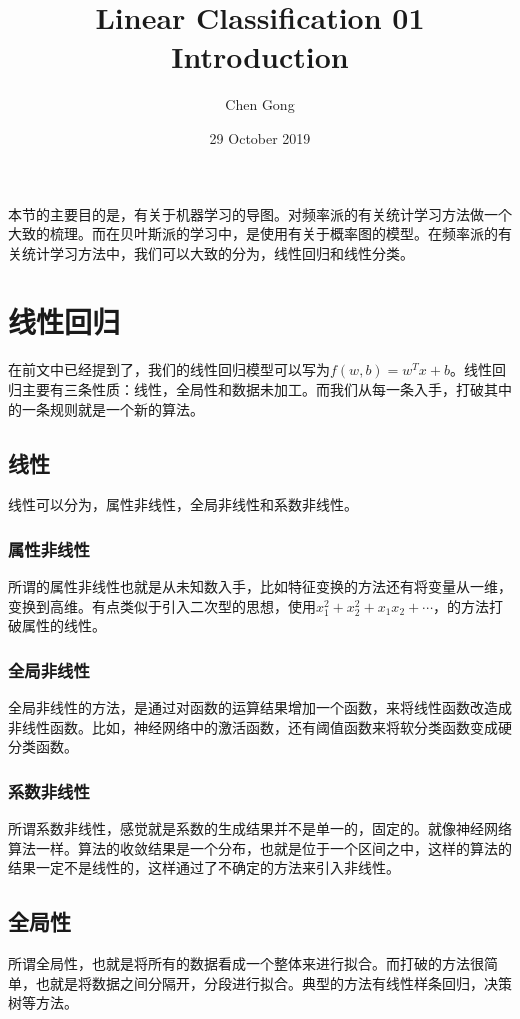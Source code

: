 \documentclass[a4paper]{article}
\title{Linear Classification 01 Introduction}
\author{Chen Gong}
\date{29 October 2019}
\begin{document}
\maketitle

本节的主要目的是，有关于机器学习的导图。对频率派的有关统计学习方法做一个大致的梳理。而在贝叶斯派的学习中，是使用有关于概率图的模型。在频率派的有关统计学习方法中，我们可以大致的分为，线性回归和线性分类。

\section{线性回归}
在前文中已经提到了，我们的线性回归模型可以写为$f(w,b)=w^Tx+b$。线性回归主要有三条性质：线性，全局性和数据未加工。而我们从每一条入手，打破其中的一条规则就是一个新的算法。

\subsection{线性}
线性可以分为，属性非线性，全局非线性和系数非线性。

\subsubsection{属性非线性}
所谓的属性非线性也就是从未知数入手，比如特征变换的方法还有将变量从一维，变换到高维。有点类似于引入二次型的思想，使用$x_1^2+x_2^2+x_1x_2+\cdots$，的方法打破属性的线性。

\subsubsection{全局非线性}
全局非线性的方法，是通过对函数的运算结果增加一个函数，来将线性函数改造成非线性函数。比如，神经网络中的激活函数，还有阈值函数来将软分类函数变成硬分类函数。

\subsubsection{系数非线性}
所谓系数非线性，感觉就是系数的生成结果并不是单一的，固定的。就像神经网络算法一样。算法的收敛结果是一个分布，也就是位于一个区间之中，这样的算法的结果一定不是线性的，这样通过了不确定的方法来引入非线性。

\subsection{全局性}
所谓全局性，也就是将所有的数据看成一个整体来进行拟合。而打破的方法很简单，也就是将数据之间分隔开，分段进行拟合。典型的方法有线性样条回归，决策树等方法。
\end{document}
